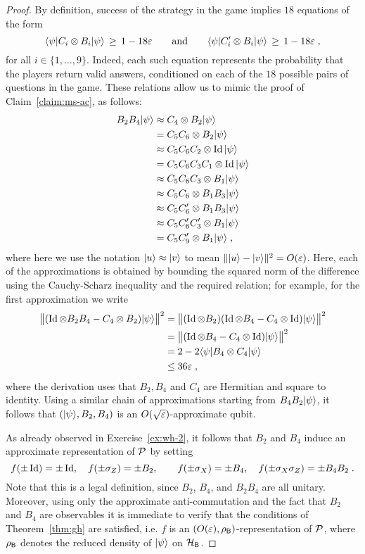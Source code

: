 \begin{proof}
By definition, success of the strategy in the game implies $18$ equations of the form 
\begin{equation}
\label{eq:ms-bc-1}
 \langle\psi| C_i \otimes B_i |\psi\rangle \,\geq \, 1-18\varepsilon\qquad\text{and}\qquad \langle\psi| C'_i \otimes B_i |\psi\rangle \,\geq \, 1-18\varepsilon\;,
\end{equation}
for all $i\in \{1,\ldots,9\}$. Indeed, each such equation represents the probability that the players return valid answers, conditioned on each of the $18$ possible pairs of questions in the game. These relations allow us to mimic the proof of Claim~\ref{claim:ms-ac}, as follows: 
\begin{align*}
B_2 B_4 |\psi\rangle & \approx C_4 \otimes B_2 |\psi\rangle\\
&= C_5 C_6 \otimes B_2 |\psi\rangle\\
&\approx C_5 C_6 C_2 \otimes \mathop{\rm Id}\nolimits |\psi\rangle\\
&= C_5 C_6 C_3 C_1 \otimes \mathop{\rm Id}\nolimits |\psi\rangle\\
&\approx C_5C_6C_3 \otimes B_1 |\psi\rangle\\
&\approx C_5C_6\otimes B_1 B_3 |\psi\rangle\\
&\approx C_5C'_6\otimes B_1 B_3 |\psi\rangle\\
&\approx C_5C'_6 C'_3\otimes B_1  |\psi\rangle\\
&=  C_5C'_9\otimes B_1  |\psi\rangle\;,
\end{align*}
where here we use the notation $|u\rangle\approx |v\rangle$ to mean $\||u\rangle - |v\rangle\|^2 = O(\varepsilon)$. Here, each of the approximations is obtained by bounding the squared norm of the difference using the Cauchy-Scharz inequality and the required relation; for example, for the first approximation we write
\begin{align*}
 \big\|(\mathop{\rm Id}\nolimits \otimes B_2 B_4 - C_4 \otimes B_2)|\psi\rangle\big\|^2
&= \big\|(\mathop{\rm Id}\nolimits \otimes B_2)(\mathop{\rm Id}\nolimits\otimes B_4 - C_4 \otimes \mathop{\rm Id}\nolimits)|\psi\rangle\big\|^2\\
&= \big\|(\mathop{\rm Id}\nolimits\otimes B_4 - C_4 \otimes \mathop{\rm Id}\nolimits)|\psi\rangle\big\|^2\\ 
&= 2 - 2 \langle\psi| B_4 \otimes C_4 |\psi\rangle \\
& \leq 36\varepsilon\;,
\end{align*}
where the derivation uses that $B_2,B_4$ and $C_4$ are Hermitian and square to identity. 
Using a similar chain of approximations starting from $B_4 B_2 |\psi\rangle$, it follows that $(|\psi\rangle,B_2,B_4)$ is an $O(\sqrt{\varepsilon})$-approximate qubit.
 
As already observed in Exercise~\ref{ex:wh-2}, it follows that $B_2$ and $B_4$ induce an approximate representation of $\mathcal{P}$ by setting 
$$ f(\pm \mathop{\rm Id}\nolimits)=\pm\mathop{\rm Id}\nolimits,\quad f(\pm\sigma_Z)=\pm B_2,\quad\quad f(\pm\sigma_X)=\pm B_4,\quad f(\pm\sigma_X\sigma_Z) = \pm B_4B_2\;.$$
Note that this is a legal definition, since $B_2$, $B_4$, and $B_2B_4$ are all unitary. Moreover, using only the approximate anti-commutation and the fact that $B_2$ and $B_4$ are observables it is immediate to verify that the conditions of Theorem~\ref{thm:gh} are satisfied, i.e. $f$ is an $(O({\varepsilon}),\rho_{\textsf{B}})$-representation of $\mathcal{P}$, where $\rho_{\textsf{B}}$ denotes the reduced density of $|\psi\rangle$ on $\mathcal{H}_{\textsf{B}}$.  


\end{proof}
